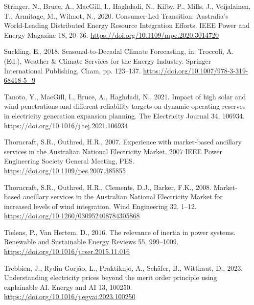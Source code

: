 \documentclass[12pt,a4paper,]{report}
\newlength{\cslhangindent}
\newenvironment{CSLReferences}[2] %
 {%
  \setlength{\parindent}{0pt}
  \ifodd #1 \everypar{\setlength{\hangindent}{\cslhangindent}}\ignorespaces\fi
  \ifnum #2 > 0
  \setlength{\parskip}{#2\baselineskip}
  \fi
 }%
 {}
\begin{document}
\begin{CSLReferences}{1}{0}
\leavevmode{}%
Stringer, N., Bruce, A., MacGill, I., Haghdadi, N., Kilby, P., Mills,
J., Veijalainen, T., Armitage, M., Wilmot, N., 2020. Consumer-{Led
Transition}: {Australia}'s {World-Leading Distributed Energy Resource
Integration Efforts}. IEEE Power and Energy Magazine 18, 20--36.
\url{https://doi.org/10.1109/mpe.2020.3014720}

\leavevmode{}%
Suckling, E., 2018. Seasonal-to-{Decadal Climate Forecasting}, in:
Troccoli, A. (Ed.), Weather \& {Climate Services} for the {Energy
Industry}. {Springer International Publishing}, {Cham}, pp. 123--137.
\url{https://doi.org/10.1007/978-3-319-68418-5_9}

\leavevmode{}%
Tanoto, Y., MacGill, I., Bruce, A., Haghdadi, N., 2021. Impact of high
solar and wind penetrations and different reliability targets on dynamic
operating reserves in electricity generation expansion planning. The
Electricity Journal 34, 106934.
\url{https://doi.org/10.1016/j.tej.2021.106934}

\leavevmode{}%
Thorncraft, S.R., Outhred, H.R., 2007. Experience with market-based
ancillary services in the {Australian National Electricity Market}. 2007
IEEE Power Engineering Society General Meeting, PES.
\url{https://doi.org/10.1109/pes.2007.385855}

\leavevmode{}%
Thorncraft, S.R., Outhred, H.R., Clements, D.J., Barker, F.K., 2008.
Market-based ancillary services in the {Australian National Electricity
Market} for increased levels of wind integration. Wind Engineering 32,
1--12. \url{https://doi.org/10.1260/030952408784305868}

\leavevmode{}%
Tielens, P., Van Hertem, D., 2016. The relevance of inertia in power
systems. Renewable and Sustainable Energy Reviews 55, 999--1009.
\url{https://doi.org/10.1016/j.rser.2015.11.016}

\leavevmode{}%
Trebbien, J., Rydin Gorjão, L., Praktiknjo, A., Schäfer, B., Witthaut,
D., 2023. Understanding electricity prices beyond the merit order
principle using explainable {AI}. Energy and AI 13, 100250.
\url{https://doi.org/10.1016/j.egyai.2023.100250}


\end{CSLReferences}
\end{document}
